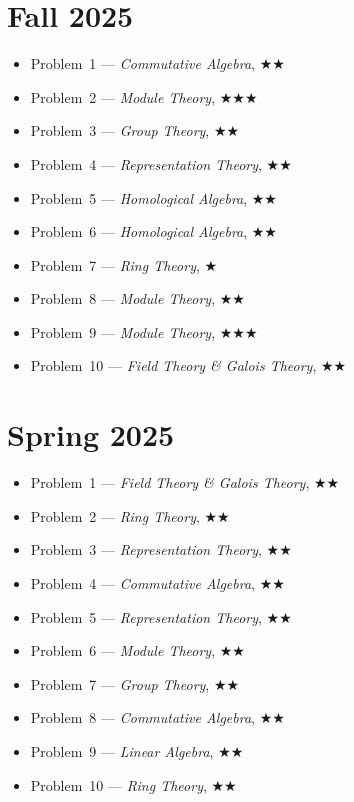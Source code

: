 \documentclass[11pt,letterpaper]{book}
\begin{document}
\section*{Fall 2025}
\begin{itemize}
\item Problem~1 --- \textit{Commutative Algebra}, $\bigstar\bigstar$
\item Problem~2 --- \textit{Module Theory}, $\bigstar\bigstar\bigstar$
\item Problem~3 --- \textit{Group Theory}, $\bigstar\bigstar$
\item Problem~4 --- \textit{Representation Theory}, $\bigstar\bigstar$
\item Problem~5 --- \textit{Homological Algebra}, $\bigstar\bigstar$
\item Problem~6 --- \textit{Homological Algebra}, $\bigstar\bigstar$
\item Problem~7 --- \textit{Ring Theory}, $\bigstar$
\item Problem~8 --- \textit{Module Theory}, $\bigstar\bigstar$
\item Problem~9 --- \textit{Module Theory}, $\bigstar\bigstar\bigstar$
\item Problem~10 --- \textit{Field Theory \& Galois Theory}, $\bigstar\bigstar$
\end{itemize}

\section*{Spring 2025}
\begin{itemize}
\item Problem~1 --- \textit{Field Theory \& Galois Theory}, $\bigstar\bigstar$
\item Problem~2 --- \textit{Ring Theory}, $\bigstar\bigstar$
\item Problem~3 --- \textit{Representation Theory}, $\bigstar\bigstar$
\item Problem~4 --- \textit{Commutative Algebra}, $\bigstar\bigstar$
\item Problem~5 --- \textit{Representation Theory}, $\bigstar\bigstar$
\item Problem~6 --- \textit{Module Theory}, $\bigstar\bigstar$
\item Problem~7 --- \textit{Group Theory}, $\bigstar\bigstar$
\item Problem~8 --- \textit{Commutative Algebra}, $\bigstar\bigstar$
\item Problem~9 --- \textit{Linear Algebra}, $\bigstar\bigstar$
\item Problem~10 --- \textit{Ring Theory}, $\bigstar\bigstar$
\end{itemize}
\end{document}

